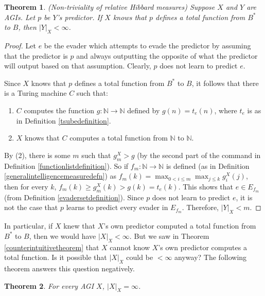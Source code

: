 \documentclass{article}
\newtheorem{theorem}{Theorem}
\begin{document}
\begin{theorem}
\label{simplehibbardnontrivialtheorem}
    (Non-triviality of relative Hibbard measures)
    Suppose $X$ and $Y$ are AGIs. Let $p$ be $Y$'s predictor.
    If $X$ knows that $p$ defines a total function from $B^*$ to $B$,
    then $|Y|_X<\infty$.
\end{theorem}

\begin{proof}
    Let $e$ be the evader which attempts to evade the predictor by assuming
    that the predictor is $p$ and always outputting the opposite of what
    the predictor will output based on that assumption. Clearly, $p$ does
    not learn to predict $e$.

    Since $X$ knows that $p$ defines a total function from $B^*$ to $B$,
    it follows that there is a Turing machine $C$ such that:
    \begin{enumerate}
        \item
        $C$ computes the function $g:\mathbb N\to \mathbb N$ defined by
        $g(n)=t_e(n)$, where $t_e$ is as in Definition \ref{tsubedefinition}.
        \item
        $X$ knows that $C$ computes a total function from $\mathbb N$ to $\mathbb N$.
    \end{enumerate}
    By (2), there is some $m$ such that $g^X_m>g$
    (by the second part of the command in Definition \ref{functionlistdefinition}).
    So if $f_m:\mathbb N\to\mathbb N$ is defined
    (as in Definition \ref{generalintelligencemeasuredefn})
    as $f_m(k)=\max_{0<i\leq m}\max_{j\leq k}g^X_i(j)$,
    then for every $k$, $f_m(k)\geq g^X_m(k)>g(k)=t_e(k)$.
    This shows that $e\in E_{f_m}$ (from Definition \ref{evadersetdefinition}).
    Since $p$ does not learn to predict $e$,
    it is not the case that $p$ learns to predict every evader in $E_{f_m}$.
    Therefore, $|Y|_X<m$.
\end{proof}

In particular, if $X$ knew that $X$'s own predictor computed a total function
from $B^*$ to $B$, then we would have $|X|_X<\infty$.
But we saw in Theorem \ref{counterintuitivetheorem} that $X$ cannot know
$X$'s own predictor computes a total function. Is it possible that $|X|_X$ could
be $<\infty$ anyway? The following theorem answers this question negatively.

\begin{theorem}
\label{Xjudgesitselfinfinitelysmarttheorem}
    For every AGI $X$, $|X|_X=\infty$.
\end{theorem}
\end{document}
